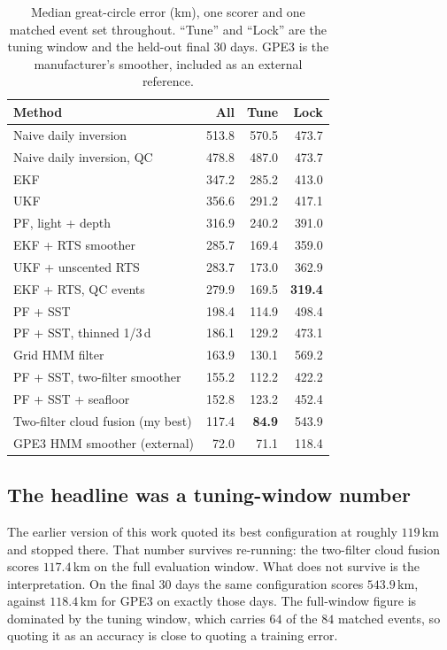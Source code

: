 \documentclass[conference]{IEEEtran}
\begin{document}
\begin{table}[t]
\caption{Median great-circle error (\si{\km}), one scorer and one matched event
set throughout. ``Tune'' and ``Lock'' are the tuning window and the held-out
final 30 days. GPE3 is the manufacturer's smoother, included as an external
reference.}
\label{tab:main}
\centering
\begin{tabular}{lrrr}
\toprule
Method & All & Tune & Lock \\
\midrule
Naive daily inversion               &  513.8 &  570.5 &  473.7 \\
Naive daily inversion, QC           &  478.8 &  487.0 &  473.7 \\
\midrule
EKF                                 &  347.2 &  285.2 &  413.0 \\
UKF                                 &  356.6 &  291.2 &  417.1 \\
PF, light + depth                   &  316.9 &  240.2 &  391.0 \\
EKF + RTS smoother                  &  285.7 &  169.4 &  359.0 \\
UKF + unscented RTS                 &  283.7 &  173.0 &  362.9 \\
EKF + RTS, QC events                &  279.9 &  169.5 &  \textbf{319.4} \\
\midrule
PF + SST                            &  198.4 &  114.9 &  498.4 \\
PF + SST, thinned 1/3\,d            &  186.1 &  129.2 &  473.1 \\
Grid HMM filter                     &  163.9 &  130.1 &  569.2 \\
PF + SST, two-filter smoother       &  155.2 &  112.2 &  422.2 \\
PF + SST + seafloor                 &  152.8 &  123.2 &  452.4 \\
Two-filter cloud fusion (my best)   &  117.4 &  \textbf{84.9} &  543.9 \\
\midrule
GPE3 HMM smoother (external)        &   72.0 &   71.1 &  118.4 \\
\bottomrule
\end{tabular}
\end{table}

\subsection{The headline was a tuning-window number}
The earlier version of this work quoted its best configuration at roughly
$119$\,\si{\km} and stopped there. That number survives re-running: the
two-filter cloud fusion scores $117.4$\,\si{\km} on the full evaluation window.
What does not survive is the interpretation. On the final 30 days the same
configuration scores $543.9$\,\si{\km}, against $118.4$\,\si{\km} for GPE3 on
exactly those days. The full-window figure is dominated by the tuning window,
which carries $64$ of the $84$ matched events, so quoting it as an accuracy is
close to quoting a training error.
\end{document}
